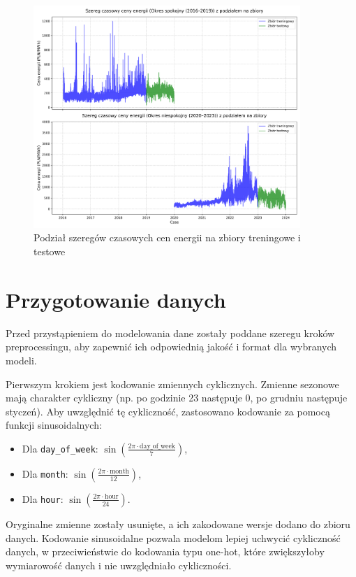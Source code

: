 \begin{figure}[h]
    \centering
    \includegraphics[width=0.9\textwidth]{../../plots/periods_split_combined.png}
    \caption{Podział szeregów czasowych cen energii na zbiory treningowe i testowe}
    \label{fig:periods_split_combined}
\end{figure}

\section{Przygotowanie danych}

Przed przystąpieniem do modelowania dane zostały poddane szeregu kroków preprocessingu, aby zapewnić ich odpowiednią jakość i format dla wybranych modeli.

Pierwszym krokiem jest kodowanie zmiennych cyklicznych. Zmienne sezonowe mają charakter cykliczny (np. po godzinie 23 następuje 0, po grudniu następuje styczeń). Aby uwzględnić tę cykliczność, zastosowano kodowanie za pomocą funkcji sinusoidalnych:

\begin{itemize}
    \item Dla \texttt{day\_of\_week}: \(\sin\left(\frac{2\pi \cdot \text{day\_of\_week}}{7}\right)\),
    \item Dla \texttt{month}: \(\sin\left(\frac{2\pi \cdot \text{month}}{12}\right)\),
    \item Dla \texttt{hour}: \(\sin\left(\frac{2\pi \cdot \text{hour}}{24}\right)\).
\end{itemize}

Oryginalne zmienne zostały usunięte, a ich zakodowane wersje dodano do zbioru danych. Kodowanie sinusoidalne pozwala modelom lepiej uchwycić cykliczność danych, w przeciwieństwie do kodowania typu one-hot, które zwiększyłoby wymiarowość danych i nie uwzględniało cykliczności.

